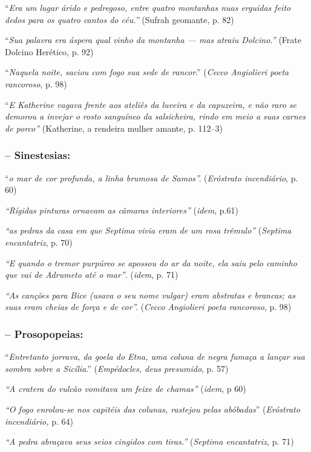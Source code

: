 \documentclass[12pt]{extarticle}
\begin{document}
``\emph{Era um lugar árido e pedregoso, entre quatro montanhas nuas
erguidas feito dedos para os quatro cantos do céu.''} (Sufrah geomante,
p. 82)

``\emph{Sua palavra era áspera qual vinho da montanha --- mas atraiu
Dolcino.''} (Frate Dolcino Herético, p. 92)

``\emph{Naquela noite, saciou com fogo sua sede de rancor}.''
(\emph{Cecco Angiolieri poeta rancoroso}, p. 98)

``\emph{E Katherine vagava frente aos ateliês da luveira e da capuzeira,
e não raro se demorou a invejar o rosto sanguíneo da salsicheira, rindo
em meio a suas carnes de porco''} (Katherine, a rendeira mulher amante,
p. 112--3)


\subsubsection{-- Sinestesias:}

``\emph{o mar de cor profunda, a linha brumosa de Samos''.}
(\emph{Eróstrato incendiário}, p. 60)

\emph{``Rígidas pinturas ornavam as câmaras interiores''} (\emph{idem},
p.61)

\emph{``as pedras da casa em que Septima vivia eram de um rosa
trêmulo''} (\emph{Septima encantatriz}, p. 70)

\emph{``E quando o tremor purpúreo se apossou do ar da noite, ela saiu
pelo caminho que vai de Adrumeto até o mar''}. (\emph{idem}, p. 71)

\emph{``As canções para Bice (usava o seu nome vulgar) eram abstratas e
brancas; as suas eram cheias de força e de cor''.} (\emph{Cecco
Angiolieri poeta rancoroso}, p. 98)

\subsubsection{-- Prosopopeias:}

``\emph{Entretanto jorrava, da goela do Etna, uma coluna de negra fumaça
a lançar sua sombra sobre a Sicília}.'' (\emph{Empédocles, deus
presumido}, p. 57)

\emph{``A cratera do vulcão vomitava um feixe de chamas''} (\emph{idem},
p 60)

\emph{``O fogo enrolou-se nos capitéis das colunas, rastejou pelas
abóbadas}'' (\emph{Eróstrato incendiário,} p. 64)

\emph{``A pedra abraçava seus seios cingidos com tiras.''}
(\emph{Septima encantatriz,} p. 71)
\end{document}
